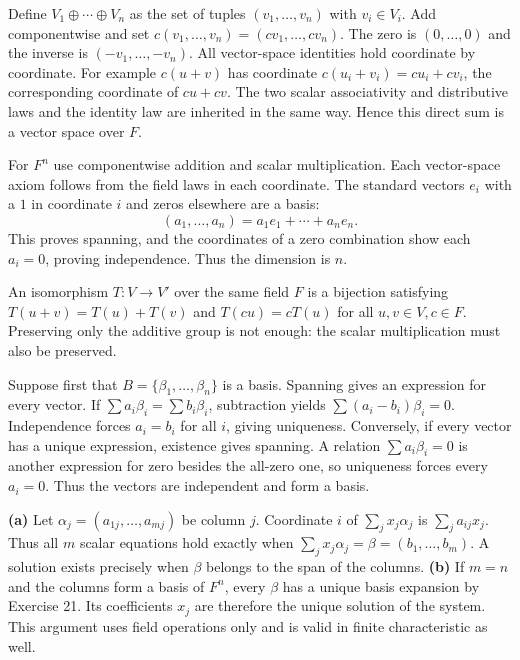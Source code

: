 Define $V_1\oplus\cdots\oplus V_n$ as the set of tuples $(v_1,\ldots,v_n)$ with $v_i\in V_i$. Add componentwise and set $c(v_1,\ldots,v_n)=(cv_1,\ldots,cv_n)$. The zero is $(0,\ldots,0)$ and the inverse is $(-v_1,\ldots,-v_n)$.
All vector-space identities hold coordinate by coordinate. For example $c(u+v)$ has coordinate $c(u_i+v_i)=cu_i+cv_i$, the corresponding coordinate of $cu+cv$. The two scalar associativity and distributive laws and the identity law are inherited in the same way. Hence this direct sum is a vector space over $F$.

For $F^n$ use componentwise addition and scalar multiplication. Each vector-space axiom follows from the field laws in each coordinate. The standard vectors $e_i$ with a $1$ in coordinate $i$ and zeros elsewhere are a basis:
\[(a_1,\ldots,a_n)=a_1e_1+\cdots+a_ne_n.\]
This proves spanning, and the coordinates of a zero combination show each $a_i=0$, proving independence. Thus the dimension is $n$.

An isomorphism $T:V\to V'$ over the same field $F$ is a bijection satisfying $T(u+v)=T(u)+T(v)$ and $T(cu)=cT(u)$ for all $u,v\in V,c\in F$. Preserving only the additive group is not enough: the scalar multiplication must also be preserved.

Suppose first that $B=\{\beta_1,\ldots,\beta_n\}$ is a basis. Spanning gives an expression for every vector. If $\sum a_i\beta_i=\sum b_i\beta_i$, subtraction yields $\sum(a_i-b_i)\beta_i=0$. Independence forces $a_i=b_i$ for all $i$, giving uniqueness.
Conversely, if every vector has a unique expression, existence gives spanning. A relation $\sum a_i\beta_i=0$ is another expression for zero besides the all-zero one, so uniqueness forces every $a_i=0$. Thus the vectors are independent and form a basis.

\textbf{(a)} Let $\alpha_j=(a_{1j},\ldots,a_{mj})$ be column $j$. Coordinate $i$ of $\sum_j x_j\alpha_j$ is $\sum_j a_{ij}x_j$. Thus all $m$ scalar equations hold exactly when $\sum_j x_j\alpha_j=\beta=(b_1,\ldots,b_m)$. A solution exists precisely when $\beta$ belongs to the span of the columns.
\textbf{(b)} If $m=n$ and the columns form a basis of $F^n$, every $\beta$ has a unique basis expansion by Exercise 21. Its coefficients $x_j$ are therefore the unique solution of the system. This argument uses field operations only and is valid in finite characteristic as well.

